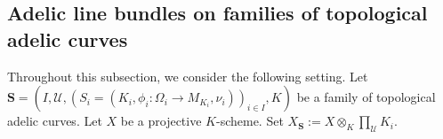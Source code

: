 \documentclass [11pt,reqno]{amsart}
\newcommand{\1}{\mathmybb{1}}
\def\cU{{\mathcal{U}}}
\begin{document}
\subsection{Adelic line bundles on families of topological adelic curves}
\label{sub:adelic_line_bundles_families_of_tac}

Throughout this subsection, we consider the following setting. Let $\mathbf{S}=(I,\cU,(S_{i}=(K_{i},\phi_{i}:\Omega_{i}\to M_{K_{i}},\nu_{i}))_{i\in I},K)$ be a family of topological adelic curves. Let $X$ be a projective $K$-scheme. Set $X_{\mathbf{S}}:=X\otimes_{K}\prod_{\cU}K_{i}$. %
\end{document}

